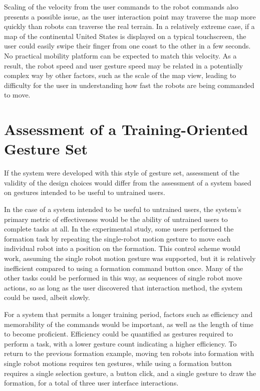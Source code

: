 Scaling of the velocity from the user commands to the robot commands also presents a possible issue, as the user interaction point may traverse the map more quickly than robots can traverse the real terrain. 
In a relatively extreme case, if a map of the continental United States is displayed on a typical touchscreen, the user could easily swipe their finger from one coast to the other in a few seconds. 
No practical mobility platform can be expected to match this velocity. 
As a result, the robot speed and user gesture speed may be related in a potentially complex way by other factors, such as the scale of the map view, leading to difficulty for the user in understanding how fast the robots are being commanded to move. 

\section{Assessment of a Training-Oriented Gesture Set}

If the system were developed with this style of gesture set, assessment of the validity of the design choices would differ from the assessment of a system based on gestures intended to be useful to untrained users. 

In the case of a system intended to be useful to untrained users, the system's primary metric of effectiveness would be the ability of untrained users to complete tasks at all. 
In the experimental study, some users performed the formation task by repeating the single-robot motion gesture to move each individual robot into a position on the formation. 
This control scheme would work, assuming the single robot motion gesture was supported, but it is relatively inefficient compared to using a formation command button once. 
Many of the other tasks could be performed in this way, as sequences of single robot move actions, so as long as the user discovered that interaction method, the system could be used, albeit slowly. 

For a system that permits a longer training period, factors such as efficiency and memorability of the commands would be important, as well as the length of time to become proficient. 
Efficiency could be quantified as gestures required to perform a task, with a lower gesture count indicating a higher efficiency.
To return to the previous formation example, moving ten robots into formation with single robot motions requires ten gestures, while using a formation button requires a single selection gesture, a button click, and a single gesture to draw the formation, for a total of three user interface interactions.  

